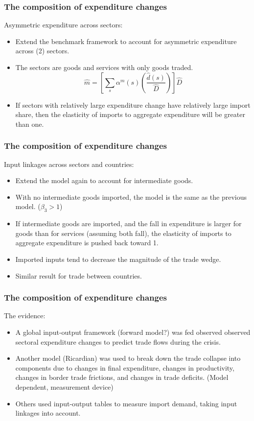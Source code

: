 \documentclass{beamer}
\begin{document}
\begin{frame}
  \frametitle{The composition of expenditure changes}
  Asymmetric expenditure across sectors:
  \begin{itemize}
    \item Extend the benchmark framework to account for asymmetric expenditure
      across (2) sectors.
      \item The sectors are goods and services with only goods traded.
    \begin{equation*}
      \hat{m}=\left[ \sum_s \alpha^m(s)\left( \frac{\hat{d}(s)}{\hat{D}} \right) \right]\hat{D}
    \end{equation*}
    \item If sectors with relatively large expenditure change have relatively large import share, then the elasticity of imports to aggregate expenditure will be greater than one.
  \end{itemize}
\end{frame}

\begin{frame}
  \frametitle{The composition of expenditure changes}
  Input linkages across sectors and countries:
  \begin{itemize}
  \item Extend the model again to account for intermediate goods.
  \item With no intermediate goods imported, the model is the same as the
    previous model. (\(\beta_3>1\))
  \item If intermediate goods are imported, and the fall in expenditure is
    larger for goods than for services (assuming both fall), the
    elasticity of imports to aggregate expenditure is pushed back toward 1.
  \item Imported inputs tend to decrease the magnitude of the trade wedge.
  \item Similar result for trade between countries.
  \end{itemize}
\end{frame}

\begin{frame}
  \frametitle{The composition of expenditure changes}
  The evidence:
  \begin{itemize}
    \item A global input-output framework (forward model?) was fed observed
      observed sectoral expenditure changes to predict trade flows during the crisis.
      \item Another model (Ricardian) was used to break down the trade collapse
        into components due to changes in final expenditure, changes in
        productivity, changes in border trade frictions, and changes in trade
        deficits. (Model dependent, measurement device)
        \item Others used input-output tables to measure import demand, taking input linkages into account.
  \end{itemize}
\end{frame}
\end{document}
